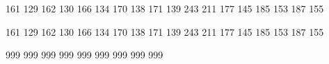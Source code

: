 

\startmapping[pl0]



 161 129 %
 162 130 %
 166 134 %
 170 138 %
 171 139 %
 243 211 %
 177 145 %
 185 153 %
 187 155 %

 161 129  %
 162 130  %
 166 134  %
 170 138  %
 171 139  %
 243 211  %
 177 145  %
 185 153  %
 187 155  %

\stopmapping 

\startmapping[pl0]

 999  %
 999  %
 999  %
 999  %
 999  %
 999  %
 999  %
 999  %
 999  %

\stopmapping 

